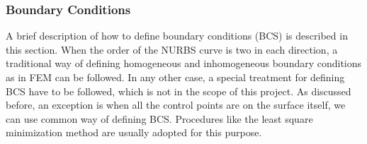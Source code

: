 \documentclass[11pt]{article}
\begin{document}
\begin{enumerate}[leftmargin=*]
	
	\begin{verbatim}

	\end{verbatim}
\end{enumerate}
\subsubsection{Boundary Conditions}
A brief description of how to define boundary conditions (BCS) is described in this section. When the order of the NURBS curve is two in each direction, a traditional way of defining homogeneous and inhomogeneous boundary conditions as in FEM can be followed. In any other case, a special treatment for defining BCS have to be followed, which is not in the scope of this project. As discussed before, an exception is when all the control points are on the surface itself, we can use common way of defining BCS. Procedures like the least square minimization method are usually adopted for this purpose. 
\end{document}
